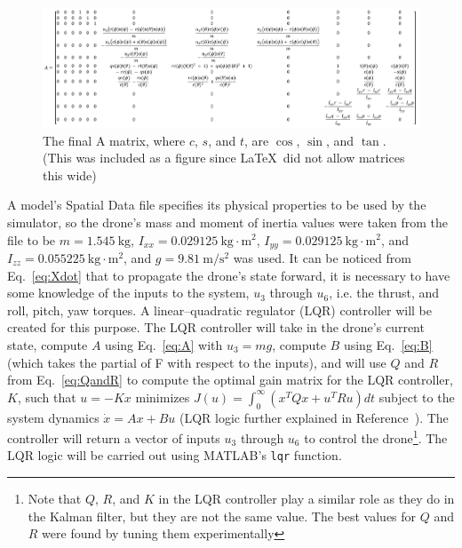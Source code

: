 \documentclass[letterpaper, paper,11pt]{AAS}	%
\begin{document}
\begin{figure}[H]
	\centering\includegraphics[width=\textwidth]{Figures/AMatrix}
	\caption{The final A matrix, where $c$, $s$, and $t$, are $\cos$, $\sin$, and $\tan$. (This was included as a figure since \LaTeX\ did not allow matrices this wide)}
	\label{fig:AMatrix}
\end{figure}

A model's Spatial Data file specifies its physical properties to be used by the simulator, so the drone's mass and moment of inertia values were taken from the file to be $m = 1.545\ \text{kg}$, $I_{xx} = 0.029125\ \text{kg}\cdot \text{m}^2$, $I_{yy} = 0.029125\ \text{kg}\cdot \text{m}^2$, and $I_{zz} = 0.055225\ \text{kg}\cdot \text{m}^2$, and $g = 9.81\ \text{m}/\text{s}^2$ was used.
It can be noticed from Eq.~\ref{eq:Xdot} that to propagate the drone's state forward, it is necessary to have some knowledge of the inputs to the system, $u_3$ through $u_6$, i.e. the thrust, and roll, pitch, yaw torques. A linear–quadratic regulator (LQR) controller will be created for this purpose. The LQR controller will take in the drone's current state, compute $A$ using Eq.~\ref{eq:A} with $u_3 = mg$, compute $B$ using Eq.~\ref{eq:B} (which takes the partial of F with respect to the inputs), and will use $Q$ and $R$ from Eq.~\ref{eq:QandR} to compute the optimal gain matrix for the LQR controller, $K$, such that $u=-Kx$ minimizes $J(u)=\int_{0}^{\infty} (x^TQx+u^TRu)dt$ subject to the system dynamics $\dot{x}=Ax+Bu$ (LQR logic further explained in Reference~). The controller will return a vector of inputs $u_3$ through $u_6$ to control the drone\footnote{Note that $Q$, $R$, and $K$ in the LQR controller play a similar role as they do in the Kalman filter, but they are not the same value. The best values for $Q$ and $R$ were found by tuning them experimentally}. The LQR logic will be carried out using MATLAB's \texttt{lqr} function\cite{LQR}.
\end{document}

